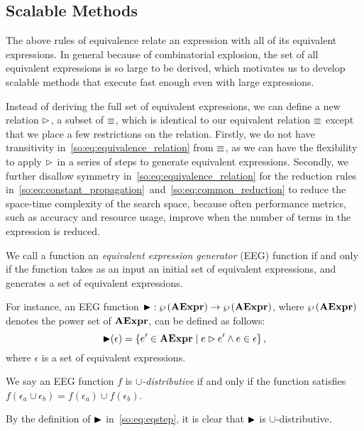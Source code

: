 \subsection{Scalable Methods}

The above rules of equivalence relate an expression with all of its equivalent
expressions.  In general because of combinatorial explosion, the set of all
equivalent expressions is so large to be derived, which motivates us to develop
scalable methods that execute fast enough even with large expressions.

Instead of deriving the full set of equivalent expressions, we can
define a new relation $\mathbin{\rhd}$, a subset of $\equiv$, which
is identical to our equivalent relation $\equiv$ except that we
place a few restrictions on the relation.  Firstly, we do not have
transitivity in~\eqref{so:eq:equivalence_relation} from $\equiv$, as
we can have the flexibility to apply $\mathbin{\rhd}$ in a series of steps
to generate equivalent expressions.  Secondly, we further disallow
symmetry in~\eqref{so:eq:equivalence_relation} for the reduction rules
in~\ref{so:eq:constant_propagation}~and~\ref{so:eq:common_reduction} to reduce
the space-time complexity of the search space, because often performance
metrics, such as accuracy and resource usage, improve when the number of terms
in the expression is reduced.

\begin{definition}
    We call a function an \emph{equivalent expression generator} (EEG) function
if and only if the function takes as an input an initial set of equivalent
expressions, and generates a set of equivalent expressions.
\end{definition}

For instance, an EEG function $\operatorname{\blacktriangleright}: \wp\left({\mathbf{AExpr}}\right) \to
\wp\left({\mathbf{AExpr}}\right)$, where $\wp\left({\mathbf{AExpr}}\right)$ denotes the power set of
$\mathbf{AExpr}$, can be defined as follows:
\begin{equation}
    \operatorname{\blacktriangleright}(\epsilon) = \left\{
        e^\prime\in\mathbf{AExpr} \mid
        e \mathbin{\rhd} e^\prime \wedge e\in\epsilon\right\},
    \label{so:eq:eqstep}
\end{equation}
where $\epsilon$ is a set of equivalent expressions.

\begin{definition}
    We say an EEG function $f$ is \emph{$\cup$-distributive} if and only if
    the function satisfies $f(\epsilon_a \cup \epsilon_b) = f(\epsilon_a) \cup
    f(\epsilon_b)$.
\end{definition}
\begin{corollary}
    By the definition of $\operatorname{\blacktriangleright}$ in~\eqref{so:eq:eqstep}, it is clear that
    $\operatorname{\blacktriangleright}$ is $\cup$-distributive.
    {}\label{so:cor:union}
\end{corollary}

